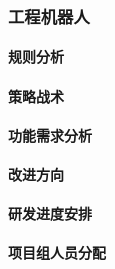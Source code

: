 \subsubsection{工程机器人}

    \paragraph{规则分析}
    
    \paragraph{策略战术}
    
    \paragraph{功能需求分析}
    
    \paragraph{改进方向}

    \paragraph{研发进度安排}

    \paragraph{项目组人员分配}
    